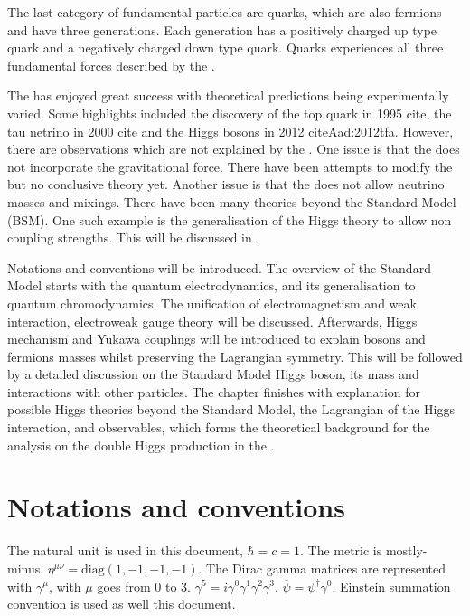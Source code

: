 The last category of fundamental particles are quarks, which are also fermions and have three generations. Each generation has a positively charged up type quark and a negatively charged down type quark. Quarks experiences all three fundamental forces described by the \SM.

The \SM has enjoyed great success with theoretical predictions being experimentally varied. Some highlights included the discovery of the top quark in 1995 cite{}, the tau netrino in 2000 cite{} and the Higgs bosons in 2012 cite{Aad:2012tfa}. However, there are observations which are not explained by the \SM. One issue is that the \SM does not incorporate the gravitational force. There have been attempts to modify the \SM but no conclusive theory yet. Another issue is that the \SM does not allow neutrino masses and mixings. There have been many theories beyond the Standard Model (BSM). One such example is the generalisation of the Higgs theory to allow non \SM coupling strengths. This will be discussed in .

Notations and conventions will be introduced. The overview of the Standard Model starts with the quantum electrodynamics, and its generalisation to quantum chromodynamics. The unification of electromagnetism and weak interaction, electroweak gauge theory will be discussed. Afterwards, Higgs mechanism and Yukawa couplings will be introduced to explain bosons and fermions masses whilst preserving the Lagrangian symmetry. This will be followed by a detailed discussion on the Standard Model Higgs boson, its mass and interactions with other particles. The chapter finishes with explanation for possible Higgs theories beyond the Standard Model, the Lagrangian of the Higgs interaction, and observables, which forms the theoretical background for the analysis on the double Higgs production in the .


\section{Notations and conventions}

The natural unit is used in this document, $\hbar = c = 1$. The metric is mostly-minus, $\eta^{\mu\nu} = \text{diag}(1,-1,-1,-1)$. The Dirac gamma matrices are represented with $\gamma^{\mu}$, with $\mu$ goes from 0 to 3. $\gamma^5 = i \gamma^{0}\gamma^{1}\gamma^{2}\gamma^{3}$. $\overline{\psi} = \psi^{\dagger}\gamma^0$. Einstein summation convention is used as well this document.

